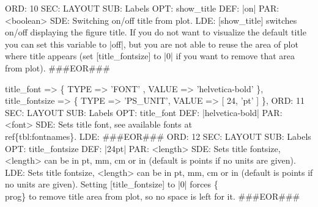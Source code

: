 \documentclass[11pt]{article}
\def\nwendcode{\endtrivlist \endgroup} %
\let\nwdocspar=\par                    %
\begin{document}
ORD: 10
SEC: LAYOUT
SUB: Labels
OPT: show_title
DEF: |on|
PAR: <boolean>
SDE: Switching on/off title from plot.
LDE: 
[show_title] switches on/off displaying the figure title. 
If you do not want to visualize the default title you can set this
variable to |off|, but you are not able to reuse the area of plot 
where title appears (set [title_fontsize] to |0| if you want to remove
that area from plot).
###EOR###
\nwendcode{}\nwdocspar
\nwenddocs{}\plusendmoddef
title_font                 => \{ TYPE => 'FONT'   , VALUE => 'helvetica-bold' \},
title_fontsize             => \{ TYPE => 'PS_UNIT', VALUE => [ 24, 'pt' ]  \},
\eatline
{}\nwendcode{}\plusendmoddef
ORD: 11
SEC: LAYOUT
SUB: Labels
OPT: title_font
DEF: |helvetica-bold|
PAR: <font>
SDE: Sets title font, see available fonts at~\\ref\{tbl:fontnames\}.
LDE: 
###EOR###
ORD: 12
SEC: LAYOUT
SUB: Labels
OPT: title_fontsize
DEF: |24pt|
PAR: <length>
SDE: Sets title fontsize, <length> can be in pt, mm, cm or in (default is points if no units are given).
LDE:
Sets title fontsize, <length> can be in pt, mm, cm or in 
(default is points if no units are given).
Setting [title_fontsize] to |0| forces \{\\prog\} to remove
title area from plot, so no space is left for it.
###EOR###
\nwendcode{}\nwdocspar
\end{document}
